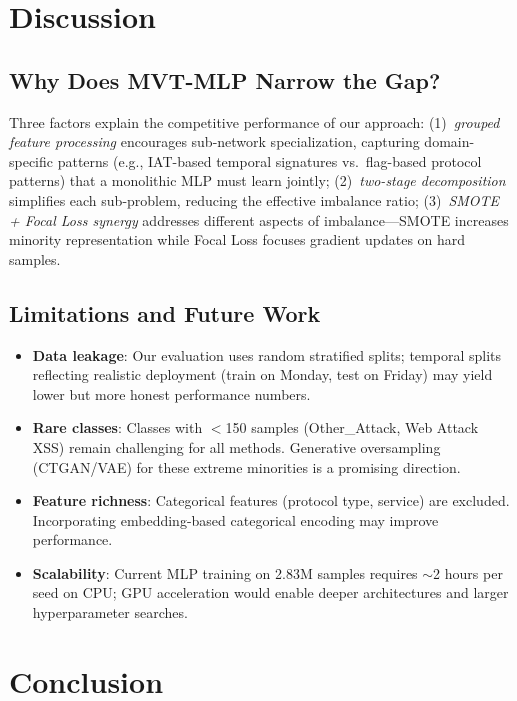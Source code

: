 \documentclass[12pt]{article}
\begin{document}
\section{Discussion}
\label{sec:discussion}

\subsection{Why Does MVT-MLP Narrow the Gap?}
Three factors explain the competitive performance of our approach: (1)~\emph{grouped feature processing} encourages sub-network specialization, capturing domain-specific patterns (e.g., IAT-based temporal signatures vs.\ flag-based protocol patterns) that a monolithic MLP must learn jointly; (2)~\emph{two-stage decomposition} simplifies each sub-problem, reducing the effective imbalance ratio; (3)~\emph{SMOTE + Focal Loss synergy} addresses different aspects of imbalance---SMOTE increases minority representation while Focal Loss focuses gradient updates on hard samples.

\subsection{Limitations and Future Work}
\begin{itemize}
    \item \textbf{Data leakage}: Our evaluation uses random stratified splits; temporal splits reflecting realistic deployment (train on Monday, test on Friday) may yield lower but more honest performance numbers.
    \item \textbf{Rare classes}: Classes with $<$150 samples (Other\_Attack, Web Attack XSS) remain challenging for all methods. Generative oversampling (CTGAN/VAE) for these extreme minorities is a promising direction.
    \item \textbf{Feature richness}: Categorical features (protocol type, service) are excluded. Incorporating embedding-based categorical encoding may improve performance.
    \item \textbf{Scalability}: Current MLP training on 2.83M samples requires $\sim$2 hours per seed on CPU; GPU acceleration would enable deeper architectures and larger hyperparameter searches.
\end{itemize}

\section{Conclusion}
\label{sec:conclusion}
\end{document}
